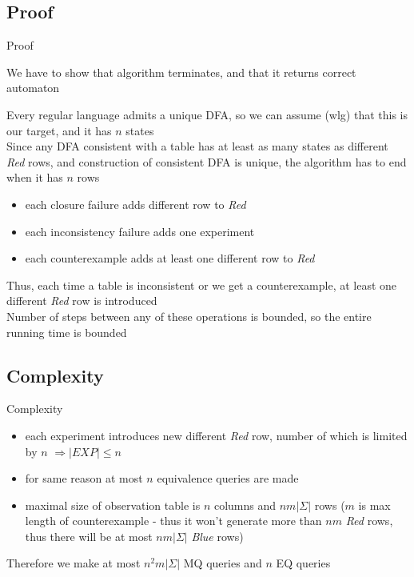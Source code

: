 \documentclass[aspectratio=169,xcolor=dvipsnames]{beamer}
\begin{document}
\subsection{Proof}
\begin{frame}[t]{Proof}


We have to show that algorithm terminates, and that it returns correct automaton \\

\vspace{3mm}

Every regular language admits a unique DFA, so we can assume (wlg) that this is our target, and it has $n$ states \\
Since any DFA consistent with a table has at least as many states as different \textit{Red} rows, and construction of consistent DFA is unique, the algorithm has to end when it has $n$ rows

\begin{itemize}
    \item each closure failure adds different row to \textit{Red}
    \item each inconsistency failure adds one experiment
    \item each counterexample adds at least one different row to \textit{Red}
\end{itemize}
Thus, each time a table is inconsistent or we get a counterexample, at least one different \textit{Red} row is introduced \\
Number of steps between any of these operations is bounded, so the entire running time is bounded

\end{frame}


\subsection{Complexity}
\begin{frame}[t]{Complexity}
\begin{itemize}
    \item each experiment introduces new different \textit{Red} row, number of which is limited by $n$ $\Rightarrow |EXP| \leq n$ 
    \item for same reason at most $n$ equivalence queries are made
    \item maximal size of observation table is $n$ columns and $nm |\Sigma|$ rows ($m$ is max length of counterexample - thus it won't generate more than $nm$ \textit{Red} rows, thus there will be at most $nm |\Sigma|$ \textit{Blue} rows)
\end{itemize}

Therefore we make at most $n^2m |\Sigma|$ MQ queries and $n$ EQ queries
\end{frame}
\end{document}
